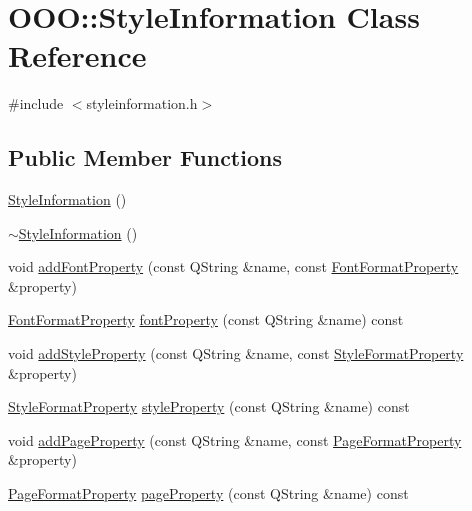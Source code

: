 \hypertarget{classOOO_1_1StyleInformation}{\section{O\+O\+O\+:\+:Style\+Information Class Reference}
\label{classOOO_1_1StyleInformation}
}


{\ttfamily \#include $<$styleinformation.\+h$>$}

\subsection*{Public Member Functions}
\begin{DoxyCompactItemize}
\item 
\hyperlink{classOOO_1_1StyleInformation_a54f030c7f334ed213de765520e106f49}{Style\+Information} ()
\item 
\hyperlink{classOOO_1_1StyleInformation_abf0b57649605b01ef1b2fc9cb36977fe}{$\sim$\+Style\+Information} ()
\item 
void \hyperlink{classOOO_1_1StyleInformation_a02ea3eb02be30740cd79e8c68152e7f2}{add\+Font\+Property} (const Q\+String \&name, const \hyperlink{classOOO_1_1FontFormatProperty}{Font\+Format\+Property} \&property)
\item 
\hyperlink{classOOO_1_1FontFormatProperty}{Font\+Format\+Property} \hyperlink{classOOO_1_1StyleInformation_a946fd659bb749c953d9565063a462c47}{font\+Property} (const Q\+String \&name) const 
\item 
void \hyperlink{classOOO_1_1StyleInformation_a8a573f924b399372a33864151ec72cce}{add\+Style\+Property} (const Q\+String \&name, const \hyperlink{classOOO_1_1StyleFormatProperty}{Style\+Format\+Property} \&property)
\item 
\hyperlink{classOOO_1_1StyleFormatProperty}{Style\+Format\+Property} \hyperlink{classOOO_1_1StyleInformation_a9f34b3c6cbf0c2cfcb16b0299ec5db75}{style\+Property} (const Q\+String \&name) const 
\item 
void \hyperlink{classOOO_1_1StyleInformation_a3f9cc043430bf7d585ca7253ea4256f4}{add\+Page\+Property} (const Q\+String \&name, const \hyperlink{classOOO_1_1PageFormatProperty}{Page\+Format\+Property} \&property)
\item 
\hyperlink{classOOO_1_1PageFormatProperty}{Page\+Format\+Property} \hyperlink{classOOO_1_1StyleInformation_a74abc64faa641fdc3213ca9a8dd18d6d}{page\+Property} (const Q\+String \&name) const 
\item 

\end{DoxyCompactItemize}
